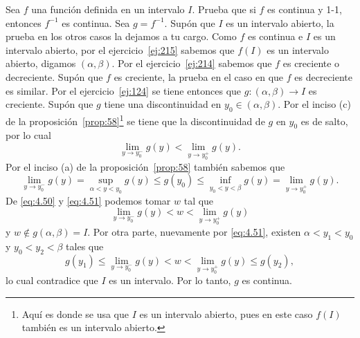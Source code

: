 \documentclass[12pt,a4paper]{book}
\begin{document}
    \begin{ejercicio}\label{ej:220}
        Sea $f$ una función definida en un
        intervalo $I$. Prueba que si $f$ es continua y 1-1, entonces $f^{-1}$ es continua.
        \sugerencia Sea $g=f^{-1}$. Supón que $I$ es un intervalo abierto, la prueba en
        los otros casos la dejamos a tu cargo. Como $f$ es continua e $I$ es un intervalo
        abierto, por el ejercicio~\ref{ej:215} sabemos que $f(I)$ es un intervalo abierto, digamos
        $(\alpha,\beta)$. Por el ejercicio~\ref{ej:214} sabemos que $f$ es creciente o decreciente. Supón
        que $f$ es creciente, la prueba en el caso en que $f$ es decreciente es similar. Por
        el ejercicio~\ref{ej:124} se tiene entonces que $g:(\alpha,\beta)\to I$ es creciente. Supón que
        $g$ tiene una discontinuidad en $y_{0}\in(\alpha,\beta)$. Por el inciso (c) de la proposición~\ref{prop:58}\footnote{Aquí es donde se usa que $I$ es un intervalo abierto, pues en este caso $f(I)$ también es
        un intervalo abierto.}
        se tiene que la discontinuidad de $g$ en $y_{0}$ es de salto, por lo cual
        \begin{equation}\label{eq:4.50}
            \lim_{y\to y_{0}^{-}}g(y)<\lim_{y\to y_{0}^{+}}g(y).
        \end{equation}
        Por el inciso (a) de la proposición~\ref{prop:58} también sabemos que
        \begin{equation}\label{eq:4.51}
            \lim_{y\to y_{0}^{-}}g(y)=\sup_{\alpha<y<y_{0}}g(y)\leq g(y_{0})\leq\inf_{y_{0}<y<\beta}g(y)=\lim_{y\to y_{0}^{+}}g(y).
        \end{equation}
        De \eqref{eq:4.50} y \eqref{eq:4.51} podemos tomar $w$ tal que
        \begin{equation*}
            \lim_{y\to y_{0}^{-}}g(y)<w<\lim_{y\to y_{0}^{+}}g(y)
        \end{equation*}
        y $w\notin g(\alpha,\beta)=I$. Por otra parte, nuevamente por \eqref{eq:4.51}, existen $\alpha<y_{1}<
        y_{0}$ y $y_{0}<y_{2}<\beta$ tales que
        \begin{equation*}
            g(y_{1})\leq\lim_{y\to y_{0}^{-}}g(y)<w<\lim_{y\to y_{0}^{+}}g(y)\leq g(y_{2}),
        \end{equation*}
        lo cual contradice que $I$ es un intervalo. Por lo tanto, $g$ es continua.
    \end{ejercicio}
\end{document}
